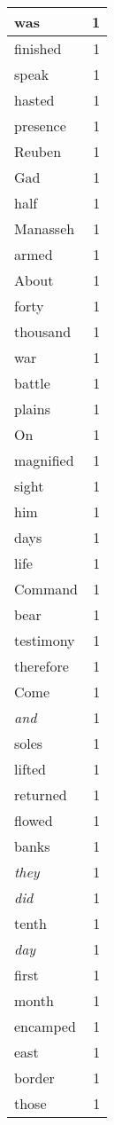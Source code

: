 \begin{center}
\begin{longtable}{l|r}
was & 1\\ \hline 
finished & 1\\ \hline 
speak & 1\\ \hline 
hasted & 1\\ \hline 
presence & 1\\ \hline 
Reuben & 1\\ \hline 
Gad & 1\\ \hline 
half & 1\\ \hline 
Manasseh & 1\\ \hline 
armed & 1\\ \hline 
About & 1\\ \hline 
forty & 1\\ \hline 
thousand & 1\\ \hline 
war & 1\\ \hline 
battle & 1\\ \hline 
plains & 1\\ \hline 
On & 1\\ \hline 
magnified & 1\\ \hline 
sight & 1\\ \hline 
him & 1\\ \hline 
days & 1\\ \hline 
life & 1\\ \hline 
Command & 1\\ \hline 
bear & 1\\ \hline 
testimony & 1\\ \hline 
therefore & 1\\ \hline 
Come & 1\\ \hline 
\emph{and} & 1\\ \hline 
soles & 1\\ \hline 
lifted & 1\\ \hline 
returned & 1\\ \hline 
flowed & 1\\ \hline 
banks & 1\\ \hline 
\emph{they} & 1\\ \hline 
\emph{did} & 1\\ \hline 
tenth & 1\\ \hline 
\emph{day} & 1\\ \hline 
first & 1\\ \hline 
month & 1\\ \hline 
encamped & 1\\ \hline 
east & 1\\ \hline 
border & 1\\ \hline 
those & 1\\ \hline 

\end{longtable}
\end{center}

